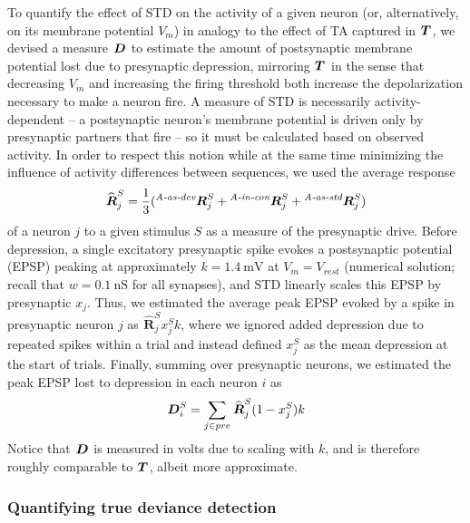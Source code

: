 \documentclass[10pt,letterpaper]{article}
\newcommand{\dev}{\textit{A-as-dev}}
\newcommand{\msc}{\textit{A-in-con}}
\newcommand{\std}{\textit{A-as-std}}
\newcommand{\ifstringequal}[4]{%
  \ifnum\pdfstrcmp{#1}{#2}=0
  #3%
  \else
  #4%
  \fi
}
\newcommand{\seqreplace}[1]{\ifstringequal{dev}{#1}{\dev}{%
    \ifstringequal{std}{#1}{\std}{%
        \ifstringequal{msc}{#1}{\msc}{#1}%
    }%
}}
\newcommand{\R}[3][]{{}^{\seqreplace{#1}}_{}\boldsymbol R^{#2}_{#3}}
\newcommand{\T}[3][]{{}^{\seqreplace{#1}}_{}\boldsymbol T^{#2}_{#3}}
\newcommand{\D}[3][]{{}^{\seqreplace{#1}}_{}\boldsymbol D^{#2}_{#3}}
\newcommand{\Rhat}[3][]{{}^{#1}_{}\widehat{\boldsymbol R}^{#2}_{#3}}
\begin{document}
To quantify the effect of STD on the activity of a given neuron (or, alternatively, on its membrane potential $V_m$) in analogy to the effect of TA captured in $\T{}{}$, we devised a measure $\D{}{}$ to estimate the amount of postsynaptic membrane potential lost due to presynaptic depression, mirroring $\T{}{}$ in the sense that decreasing $V_m$ and increasing the firing threshold both increase the depolarization necessary to make a neuron fire. A measure of STD is necessarily activity-dependent -- a postsynaptic neuron's membrane potential is driven only by presynaptic partners that fire -- so it must be calculated based on observed activity. In order to respect this notion while at the same time minimizing the influence of activity differences between sequences, we used the average response
\begin{equation}
    \Rhat{S}{j} = \frac{1}{3} (\R[dev]{S}{j} + \R[msc]{S}{j} + \R[std]{S}{j}) \label{eq:Rhat}
\end{equation}
of a neuron $j$ to a given stimulus $S$ as a measure of the presynaptic drive. Before depression, a single excitatory presynaptic spike evokes a postsynaptic potential (EPSP) peaking at approximately $k = \qty{1.4}{\milli\volt}$ at $V_m = V_{rest}$ (numerical solution; recall that $w = \qty{0.1}{\nano\siemens}$ for all synapses), and STD linearly scales this EPSP by presynaptic $x_j$. Thus, we estimated the average peak EPSP evoked by a spike in presynaptic neuron $j$ as $\Rhat{S}{j} x_j^S k$, where we ignored added depression due to repeated spikes within a trial and instead defined $x_j^S$ as the mean depression at the start of trials. Finally, summing over presynaptic neurons, we estimated the peak EPSP lost to depression in each neuron $i$ as
\begin{equation}
    \D{S}{i} = \sum_{j \in pre} \Rhat{S}{j} (1-x_j^S) k \label{eq:D}
\end{equation}
Notice that $\D{}{}$ is measured in volts due to scaling with $k$, and is therefore roughly comparable to $\T{}{}$, albeit more approximate.

\subsubsection*{Quantifying true deviance detection}
\end{document}
